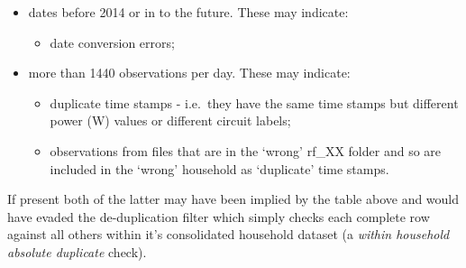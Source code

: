 \documentclass[]{article}
\newenvironment{Shaded}{\begin{snugshade}}{\end{snugshade}}
\newcommand{\KeywordTok}[1]{\textcolor[rgb]{0.13,0.29,0.53}{\textbf{#1}}}
\newcommand{\DataTypeTok}[1]{\textcolor[rgb]{0.13,0.29,0.53}{#1}}
\newcommand{\DecValTok}[1]{\textcolor[rgb]{0.00,0.00,0.81}{#1}}
\newcommand{\FloatTok}[1]{\textcolor[rgb]{0.00,0.00,0.81}{#1}}
\newcommand{\CharTok}[1]{\textcolor[rgb]{0.31,0.60,0.02}{#1}}
\newcommand{\StringTok}[1]{\textcolor[rgb]{0.31,0.60,0.02}{#1}}
\newcommand{\CommentTok}[1]{\textcolor[rgb]{0.56,0.35,0.01}{\textit{#1}}}
\newcommand{\OperatorTok}[1]{\textcolor[rgb]{0.81,0.36,0.00}{\textbf{#1}}}
\newcommand{\NormalTok}[1]{#1}
\providecommand{\tightlist}{%
  \setlength{\itemsep}{0pt}\setlength{\parskip}{0pt}}
\begin{document}
\begin{itemize}
\tightlist
\item
  dates before 2014 or in to the future. These may indicate:

  \begin{itemize}
  \tightlist
  \item
    date conversion errors;
  \end{itemize}
\item
  more than 1440 observations per day. These may indicate:

  \begin{itemize}
  \tightlist
  \item
    duplicate time stamps - i.e.~they have the same time stamps but
    different power (W) values or different circuit labels;
  \item
    observations from files that are in the `wrong' rf\_XX folder and so
    are included in the `wrong' household as `duplicate' time stamps.
  \end{itemize}
\end{itemize}

If present both of the latter may have been implied by the table above
and would have evaded the de-duplication filter which simply checks each
complete row against all others within it's consolidated household
dataset (a \emph{within household absolute duplicate} check).

\begin{Shaded}
\end{Shaded}
\end{document}
